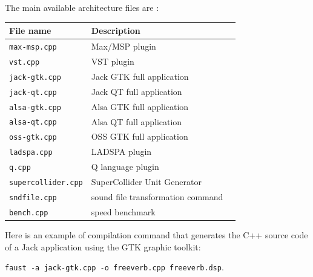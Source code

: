 \documentclass{article}
\begin{document}
\vspace{5 mm}

The main available architecture files are :

\vspace{5 mm}

\begin{tabular}{|l|l|l|}
\hline
\textbf{File name}			& \textbf{Description}   \\
\hline
\texttt{max-msp.cpp} 		& Max/MSP plugin  \\
\texttt{vst.cpp} 			& VST plugin  \\
\texttt{jack-gtk.cpp} 		& Jack GTK full application  \\
\texttt{jack-qt.cpp} 		& Jack QT full application  \\
\texttt{alsa-gtk.cpp} 		& Alsa GTK full application  \\
\texttt{alsa-qt.cpp} 		& Alsa QT full application  \\
\texttt{oss-gtk.cpp} 		& OSS GTK full application  \\
\texttt{ladspa.cpp} 		& LADSPA plugin  \\
\texttt{q.cpp} 				& Q language plugin  \\
\texttt{supercollider.cpp} 	& SuperCollider Unit Generator  \\
\texttt{sndfile.cpp} 		& sound file transformation command \\
\texttt{bench.cpp} 			& speed benchmark   \\

\hline
\end{tabular}

\vspace{5 mm}

Here is an example of compilation command that generates the C++ source code of a Jack application using the GTK graphic toolkit:

\texttt{faust -a jack-gtk.cpp -o freeverb.cpp freeverb.dsp}.

\vspace{5 mm}

\end{document}
